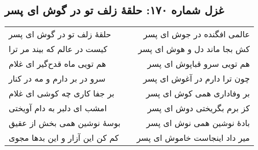 \begin{center}
\section*{غزل شماره ۱۷۰: حلقهٔ زلف تو در گوش ای پسر}
\label{sec:170}
\begin{longtable}{l p{0.5cm} r}
حلقهٔ زلف تو در گوش ای پسر
&&
عالمی افگنده در جوش ای پسر
\\
کیست در عالم که بیند مر ترا
&&
کش بجا ماند دل و هوش ای پسر
\\
هم تویی ماه قدح‌گیر ای غلام
&&
هم تویی سرو قباپوش ای پسر
\\
سرو در بر دارم و مه در کنار
&&
چون ترا دارم در آغوش ای پسر
\\
بر جفا کاری چه کوشی ای غلام
&&
بر وفاداری همی کوش ای پسر
\\
امشب ای دلبر به دام آویختی
&&
کز برم بگریختی دوش ای پسر
\\
بوسهٔ نوشین همی بخش از عقیق
&&
بادهٔ نوشین همی نوش ای پسر
\\
کم کن این آزار و این بدها مجوی
&&
میر داد اینجاست خاموش ای پسر
\\
\end{longtable}
\end{center}
